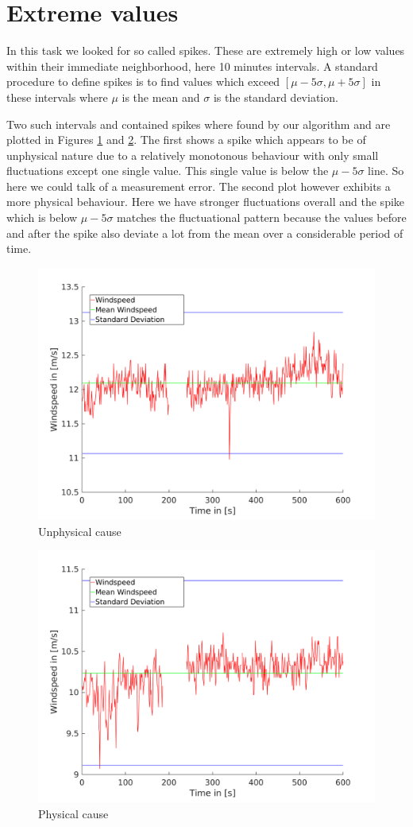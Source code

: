 \documentclass[10pt]{article}
\begin{document}
\section{Extreme values}
In this task we looked for so called spikes. These are extremely high or low values within their immediate neighborhood, here 10 minutes intervals. A standard procedure to define spikes is to find values which exceed $[\mu - 5\sigma , \mu+5\sigma]$ in these intervals where $\mu$ is the mean and $\sigma$ is the standard deviation. 

Two such intervals and contained spikes where found by our algorithm and are plotted in Figures \ref{fig:spikeUnphys} and \ref{fig:spikePhys}. The first shows a spike which appears to be of unphysical nature due to a relatively monotonous behaviour with only small fluctuations except one single value. This single value is below the $\mu-5\sigma$ line. So here we could talk of a measurement error. The second plot however exhibits a more physical behaviour. Here we have stronger fluctuations overall and the spike which is below $\mu-5\sigma$ matches the fluctuational pattern because the values before and after the spike also deviate a lot from the mean over a considerable period of time.


\begin{figure}[htb!]
  \centering
  \includegraphics[width=0.65\linewidth]{../Plots/spikesintervall440.png}
  \caption{Unphysical cause}
  \label{fig:spikeUnphys}
\end{figure}
\begin{figure}[htb!]
  \centering
  \includegraphics[width=0.65\linewidth]{../Plots/spikesintervall942.png}
  \caption{Physical cause}
    \label{fig:spikePhys}
\end{figure}
\end{document}

